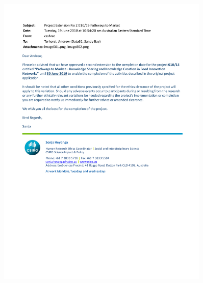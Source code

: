\begin{figure}[hbt!]
    \centering
    \includegraphics[width = 0.9\textwidth]{Images/CSSHREC_010_15_EXT.pdf}
    \caption[Extension of ethics approval -- CSIRO]{}
    \label{fig:csiro_ethics_approval_ext}
\end{figure}

